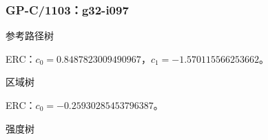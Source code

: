 \par\noindent\begin{minipage}{\linewidth}
\subsubsection{GP-C/1103：g32-i097}\leavevmode\par
\noindent\begin{minipage}{\linewidth}
参考路径树\par
\begin{center}\end{center}
ERC：$c_{0}=0.8487823009490967$，$c_{1}=-1.570115566253662$。\par
\end{minipage}\par\medskip
\noindent\begin{minipage}{\linewidth}
区域树\par
\begin{center}\end{center}
ERC：$c_{0}=-0.25930285453796387$。\par
\end{minipage}\par\medskip
\noindent\begin{minipage}{\linewidth}
强度树\par
\begin{center}\end{center}
\end{minipage}\par\medskip
\end{minipage}\par\bigskip
